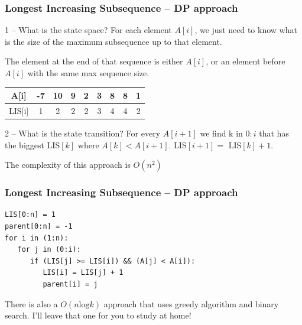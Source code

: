 \documentclass{beamer}
\begin{document}
\begin{frame}
  \frametitle{Longest Increasing Subsequence -- DP approach}
  {\smaller
  \begin{block}{1 -- What is the state space?}
    For each element $A[i]$, we just need to know what is the size of
    the maximum subsequence up to that element.

    \medskip

    The element at the end of that sequence is either $A[i]$, or an element 
    before $A[i]$ with the same max sequence size.
  \end{block}

  \bigskip

  \begin{tabular}{|c|c|c|c|c|c|c|c|c|}
    \hline
    A[i] & -7 & 10 & 9 & 2 & 3 & 8 & 8 & 1\\
    \hline
    LIS[i] & 1 & 2 & 2 & 2 & 3 & 4 & 4 & 2\\
    \hline
  \end{tabular}

  \begin{block}{2 -- What is the state transition?}
    For every $A[i+1]$ we find k in $0:i$ that has the biggest
    LIS$[k]$ where $A[k] < A[i+1]$. LIS$[i+1] =$ LIS$[k] + 1$.
  \end{block}

  The complexity of this approach is $O(n^2)$
  }
\end{frame}

\begin{frame}[fragile]
  \frametitle{Longest Increasing Subsequence -- DP approach}
  {\small
\begin{verbatim}
LIS[0:n] = 1
parent[0:n] = -1
for i in (1:n):
   for j in (0:i):
      if (LIS[j] >= LIS[i]) && (A[j] < A[i]):
         LIS[i] = LIS[j] + 1
         parent[i] = j
\end{verbatim}
  }

\vfill

\begin{block}{}
  There is also a $O(n\text{log}k)$ approach that uses greedy
  algorithm and binary search. I'll leave that one for you to study at home!
\end{block}
\end{frame}
\end{document}
